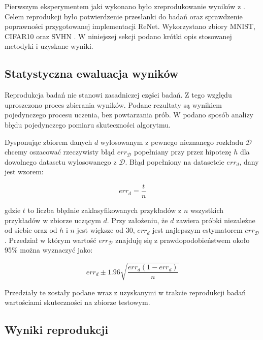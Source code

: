 \documentclass[oneside, mag]{mgr}
\begin{document}
Pierwszym eksperymentem jaki wykonano było zreprodukowanie wyników z \cite{DBLP:journals/corr/VisinKCMCB15}. Celem reprodukcji było potwierdzenie przesłanki do badań oraz sprawdzenie poprawności przygotowanej implementacji ReNet. Wykorzystano zbiory MNIST, CIFAR10 oraz SVHN \cite{svhn}. W niniejszej sekcji podano krótki opis stosowanej metodyki i uzyskane wyniki.

\subsection{Statystyczna ewaluacja wyników}

Reprodukcja badań nie stanowi zasadniczej części badań. Z tego względu uproszczono proces zbierania wyników. Podane rezultaty są wynikiem pojedynczego procesu uczenia, bez powtarzania prób. W \cite{tom-mitchell-machine-learning} podano sposób analizy błędu pojedynczego pomiaru skuteczności algorytmu.

Dysponując zbiorem danych $d$ wylosowanym z pewnego nieznanego rozkładu $\mathcal{D}$ chcemy oszacować rzeczywisty błąd $err_{\mathcal{D}}$ popełniany przy przez hipotezę $h$ dla dowolnego datasetu wylosowanego z $\mathcal{D}$. Błąd popełniony na datasetcie $err_d$, dany jest wzorem:

\begin{equation}
	err_d = \frac{t}{n}
\end{equation}

gdzie $t$ to liczba błędnie zaklasyfikowanych przykładów z $n$ wszystkich przykładów w zbiorze uczącym $d$.
Przy założeniu, że $d$ zawiera próbki niezależne od siebie oraz od $h$ i $n$ jest większe od 30, $err_d$ jest najlepszym estymatorem $err_{\mathcal{D}}$. Przedział w którym wartość $err_{\mathcal{D}}$ znajduję się z prawdopodobieństwem około 95\% można wyznaczyć jako:

\begin{equation}
	err_{d} \pm 1.96 \sqrt{\frac{err_{d}(1 - err_{d})}{n}} 
\end{equation}

Przedziały te zostały podane wraz z uzyskanymi w trakcie reprodukcji badań wartościami skuteczności na zbiorze testowym.

\subsection{Wyniki reprodukcji}
\end{document}
